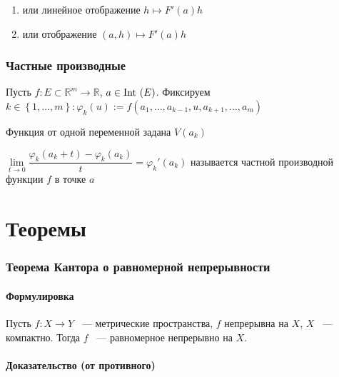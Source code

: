 \documentclass{article}
\begin{document}
            \begin{enumerate}
            
                \item или линейное отображение $h \mapsto F'(a) h$
                
                \item или отображение $(a, h) \mapsto F'(a) h$ 
                
            \end{enumerate}
            
    
            
    \newpage
    
    \section{Частные производные}
    
        Пусть $f : E \subset \mathbb{R}^m \rightarrow \mathbb{R}$, $a \in \Int (E)$. Фиксируем $k \in \left\{ 1, \ldots, m \right\} : \varphi_k(u) := f(a_1, \ldots, a_{k - 1}, u, a_{k + 1}, \ldots, a_m)$
        
        Функция от одной переменной задана $V(a_k)$
        
        $\lim\limits_{t \rightarrow 0} \dfrac{\varphi_k(a_k + t) - \varphi_k(a_k)}{t} = \varphi_k'(a_k)$ называется частной производной функции $f$ в точке $a$
        
        
        
\newpage
	
\part{Теоремы}

	\newpage
	
	\section{Теорема Кантора о равномерной непрерывности}
	
        \subsection{Формулировка}
        
            Пусть $f: X \rightarrow Y$ ~--- метрические пространства, $f$ непрерывна на $X$, $X$ ~--- компактно. Тогда $f$ ~--- равномерное непрерывно на $X$.
		
		\subsection{Доказательство (от противного)}
		
\end{document}
